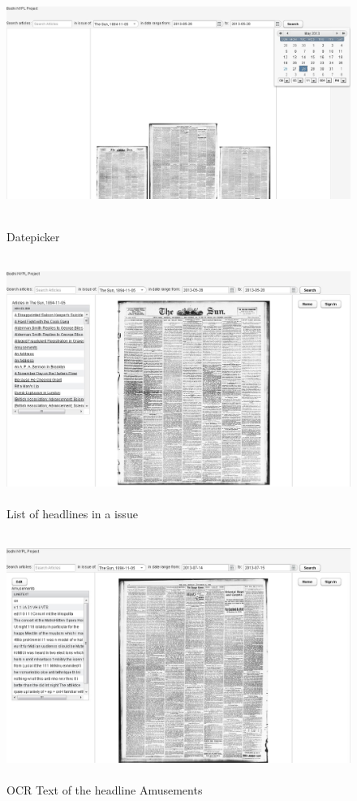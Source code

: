 \documentclass[12pt]{article}
\begin{document}
\begin{figure}[H]
\centering
\includegraphics[width=14cm,height=8cm]{datepicker.jpg}
\caption{Datepicker}
\label{fig:6}
\end{figure}

\begin{figure}[H]
\centering
\includegraphics[width=14cm,height=8cm]{results.jpg}
\caption{List of headlines in a issue}
\label{fig:7}
\end{figure}


\begin{figure}[H]
\centering
\includegraphics[width=14cm,height=8cm]{beforeEditText.jpg}
\caption{OCR Text of the headline \textasciigrave Amusements\textasciiacute}
\label{fig:8}
\end{figure}
\end{document}
